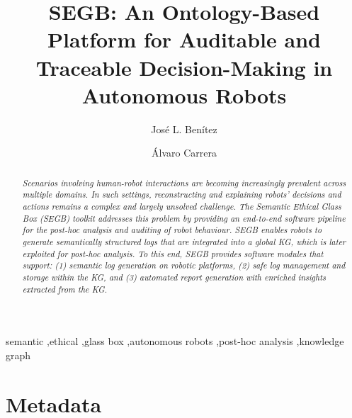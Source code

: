 \documentclass[preprint,12pt, a4paper]{elsarticle}
\begin{document}
\renewcommand{\labelenumii}{\arabic{enumi}.\arabic{enumii}}

\begin{frontmatter}

\title{SEGB: An Ontology-Based Platform for Auditable and Traceable Decision-Making in Autonomous Robots}

\author[label1]{José L. Benítez} %
\author[label2]{Álvaro Carrera}

\address[label1]{Universidad Politécnica de Madrid, Spain, jose.benitez@upm.es}
\address[label2]{Universidad Politécnica de Madrid, Spain, a.carrera@upm.es}


\begin{abstract}


\textit{Scenarios involving human-robot interactions are becoming increasingly prevalent across multiple domains. In such settings, reconstructing and explaining robots' decisions and actions remains a complex and largely unsolved challenge. The Semantic Ethical Glass Box (SEGB) toolkit addresses this problem by providing an end-to-end software pipeline for the post-hoc analysis and auditing of robot behaviour. SEGB enables robots to generate semantically structured logs that are integrated into a global \ac{KG}, which is later exploited for post-hoc analysis. To this end, SEGB provides software modules that support: (1) semantic log generation on robotic platforms, (2) safe log management and storage within the \ac{KG}, and (3) automated report generation with enriched insights extracted from the \ac{KG}.}


\end{abstract}

\begin{keyword}
semantic \sep ethical \sep glass box \sep autonomous robots \sep post-hoc analysis \sep knowledge graph



\end{keyword}

\end{frontmatter}

\section*{Metadata}
\label{}
\end{document}
